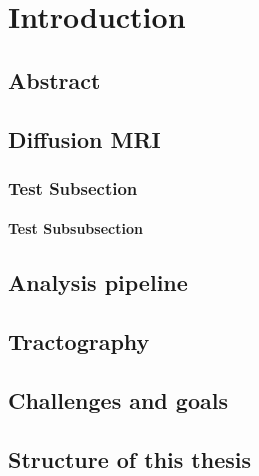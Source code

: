 \chapter{Introduction}

\section*{Abstract}
\lipsum[1-1]



\section{Diffusion MRI}
\lipsum[2-5]

\subsection{Test Subsection}
\subsubsection{Test Subsubsection}

\section{Analysis pipeline}
\lipsum[2-5]

\section{Tractography}
\lipsum[2-5]

\section{Challenges and goals}
\lipsum[2-5]

\section{Structure of this thesis}
\lipsum[2-5]